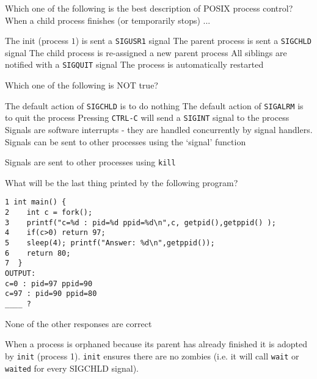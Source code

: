 \variant
Which one of the following is the best description of POSIX process control? When a child process finishes (or temporarily stops) ...

\begin{answers}
\answer The init (process $1$) is sent a {\tt SIGUSR1} signal
\correctanswer The parent process is sent a {\tt SIGCHLD} signal
\answer The child process is re-assigned a new parent process
\answer All siblings are notified with a {\tt SIGQUIT} signal
\answer The process is automatically restarted
\end{answers}
\begin{solution}
\end{solution}



\variant
Which one of the following is NOT true?
\begin{answers}
\answer The default action of {\tt SIGCHLD} is to do nothing
\answer The default action of {\tt SIGALRM} is to quit the process
\answer Pressing {\tt CTRL-C} will send a {\tt SIGINT} signal to the process
\answer Signals are software interrupts - they are handled concurrently by signal handlers.
\correctanswer Signals can be sent to other processes using the `signal' function
\end{answers}
\begin{solution}
Signals are sent to other processes using {\tt kill}
\end{solution}


\variant
What will be the last thing printed by the following program?
\begin{verbatim}
1 int main() {
2    int c = fork();
3    printf("c=%d : pid=%d ppid=%d\n",c, getpid(),getppid() );
4    if(c>0) return 97;
5    sleep(4); printf("Answer: %d\n",getppid());
6    return 80;
7  }
OUTPUT:
c=0 : pid=97 ppid=90
c=97 : pid=90 ppid=80
____ ?
\end{verbatim}
\begin{answers}
\answer None of the other responses are correct
\end{answers}
\begin{solution}
When a process is orphaned because its parent has already finished it is adopted by {\tt init} (process 1). {\tt init} ensures there are no zombies (i.e. it will call {\tt wait} or {\tt waited} for every SIGCHLD signal).
\end{solution}




